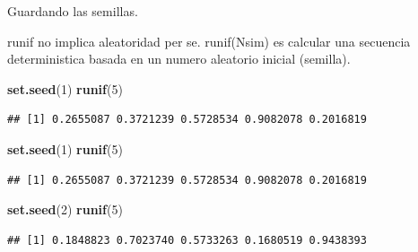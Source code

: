 \documentclass[ignorenonframetext,]{beamer}
\newenvironment{Shaded}{\begin{snugshade}}{\end{snugshade}}
\newcommand{\KeywordTok}[1]{\textcolor[rgb]{0.13,0.29,0.53}{\textbf{#1}}}
\newcommand{\DecValTok}[1]{\textcolor[rgb]{0.00,0.00,0.81}{#1}}
\newcommand{\NormalTok}[1]{#1}
\begin{document}
\begin{frame}[fragile]

\begin{block}{Guardando las semillas.}

runif no implica aleatoridad per se. runif(Nsim) es calcular una
secuencia deterministica basada en un numero aleatorio inicial
(semilla).

\begin{Shaded}
\begin{Highlighting}[]
\KeywordTok{set.seed}\NormalTok{(}\DecValTok{1}\NormalTok{)}
\KeywordTok{runif}\NormalTok{(}\DecValTok{5}\NormalTok{)}
\end{Highlighting}
\end{Shaded}

\begin{verbatim}
## [1] 0.2655087 0.3721239 0.5728534 0.9082078 0.2016819
\end{verbatim}

\begin{Shaded}
\begin{Highlighting}[]
\KeywordTok{set.seed}\NormalTok{(}\DecValTok{1}\NormalTok{)}
\KeywordTok{runif}\NormalTok{(}\DecValTok{5}\NormalTok{)}
\end{Highlighting}
\end{Shaded}

\begin{verbatim}
## [1] 0.2655087 0.3721239 0.5728534 0.9082078 0.2016819
\end{verbatim}

\begin{Shaded}
\begin{Highlighting}[]
\KeywordTok{set.seed}\NormalTok{(}\DecValTok{2}\NormalTok{)}
\KeywordTok{runif}\NormalTok{(}\DecValTok{5}\NormalTok{)}
\end{Highlighting}
\end{Shaded}

\begin{verbatim}
## [1] 0.1848823 0.7023740 0.5733263 0.1680519 0.9438393
\end{verbatim}

\end{block}

\end{frame}
\end{document}
